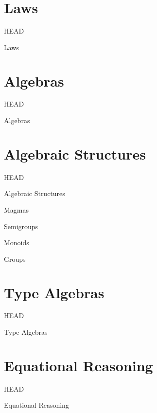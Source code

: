 \documentclass[utf8x,notes,17pt]{beamer}
\newcommand{\head}[1]{\begin{center}
\vspace{13mm}\hspace{-1mm}\Huge{{#1}}
\end{center}}
\begin{document}
\section{Laws}
\label{sec-4}
\begin{frame}[fragile,plain,label=sec-4-1]{HEAD}
\head{Laws}
\end{frame}
\section{Algebras}
\label{sec-5}
\begin{frame}[fragile,plain,label=sec-5-1]{HEAD}
\head{Algebras}
\end{frame}
\section{Algebraic Structures}
\label{sec-6}
\begin{frame}[fragile,plain,label=sec-6-1]{HEAD}
\head{Algebraic Structures}
\end{frame}
\begin{frame}[fragile,label=sec-6-2]{Magmas}
\end{frame}
\begin{frame}[fragile,label=sec-6-3]{Semigroups}
\end{frame}
\begin{frame}[fragile,label=sec-6-4]{Monoids}
\end{frame}
\begin{frame}[fragile,label=sec-6-5]{Groups}
\end{frame}
\section{Type Algebras}
\label{sec-7}
\begin{frame}[fragile,plain,label=sec-7-1]{HEAD}
\head{Type Algebras}
\end{frame}
\section{Equational Reasoning}
\label{sec-8}
\begin{frame}[fragile,plain,label=sec-8-1]{HEAD}
\head{Equational Reasoning}
\end{frame}
\end{document}
